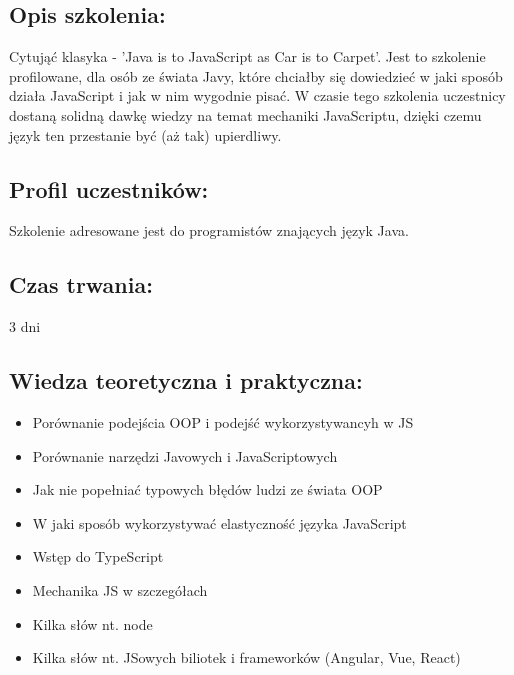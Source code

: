 \documentclass{article}[10pt]
\begin{document}
	\subsection*{Opis szkolenia:}
	\begin{adjustwidth}{2cm}{}
\justifying
		Cytująć klasyka - 'Java is to JavaScript as Car is to Carpet'. 
    Jest to szkolenie profilowane, dla osób ze świata Javy, które chciałby się dowiedzieć w jaki sposób działa JavaScript i jak w nim wygodnie pisać.
    W czasie tego szkolenia uczestnicy dostaną solidną dawkę wiedzy na temat mechaniki JavaScriptu, dzięki czemu język ten przestanie być (aż tak) upierdliwy.
	\end{adjustwidth}
	\subsection*{Profil uczestników:}
\begin{adjustwidth}{2cm}{}
\justifying
	
Szkolenie adresowane jest do programistów znających język Java.
\end{adjustwidth}
	\subsection*{Czas trwania:}
\begin{adjustwidth}{2cm}{}
	3 dni
\end{adjustwidth}

	\subsection*{Wiedza teoretyczna i praktyczna:}
\begin{adjustwidth}{1.5cm}{}
	\begin{itemize}
		\item Porównanie podejścia OOP i podejść wykorzystywancyh w JS
		\item Porównanie narzędzi Javowych i JavaScriptowych
		\item Jak nie popełniać typowych błędów ludzi ze świata OOP
		\item W jaki sposób wykorzystywać elastyczność języka JavaScript
		\item Wstęp do TypeScript
		\item Mechanika JS w szczegółach
		\item Kilka słów nt. node
		\item Kilka słów nt. JSowych biliotek i frameworków (Angular, Vue, React)
	\end{itemize}
\end{adjustwidth}
\end{document}
